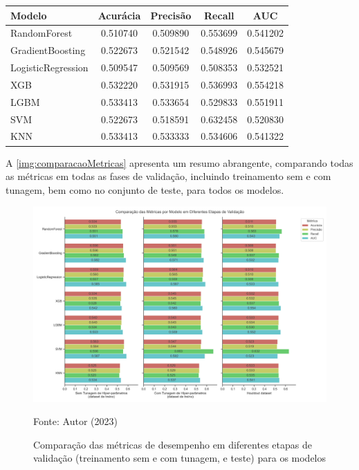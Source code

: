\begin{table}[htb]
	{
		\begin{tabular}{lcccc}
			\toprule
			\textbf{Modelo} & \textbf{Acurácia} & \textbf{Precisão} & \textbf{Recall} & \textbf{AUC} \\
			\midrule \midrule
			RandomForest & 0.510740 & 0.509890 & 0.553699 & 0.541202 \\
			\midrule
			GradientBoosting & 0.522673 & 0.521542 & 0.548926 & 0.545679 \\
			\midrule
			LogisticRegression & 0.509547 & 0.509569 & 0.508353 & 0.532521 \\
			\midrule
			XGB & 0.532220 & 0.531915 & 0.536993 & 0.554218 \\
			\midrule
			LGBM & 0.533413 & 0.533654 & 0.529833 & 0.551911 \\
			\midrule
			SVM & 0.522673 & 0.518591 & 0.632458 & 0.520830 \\
			\midrule
			KNN & 0.533413 & 0.533333 & 0.534606 & 0.541322 \\
			\bottomrule
		\end{tabular}
	}
	{
	}
\end{table}

A \autoref{img:comparacaoMetricas} apresenta um resumo abrangente, comparando todas as métricas em todas as fases de validação, incluindo treinamento sem e com tunagem, bem como no conjunto de teste, para todos os modelos.

\begin{figure}[H]
	\centering
	\caption{\label{img:comparacaoMetricas}Comparação das métricas de desempenho em diferentes etapas de validação (treinamento sem e com tunagem, e teste) para os modelos}
	\includegraphics[scale=0.5]{USPSC-img/comparacao_metricas_por_modelo.png}
	\begin{center}
		Fonte: Autor (2023)
	\end{center}
\end{figure}

